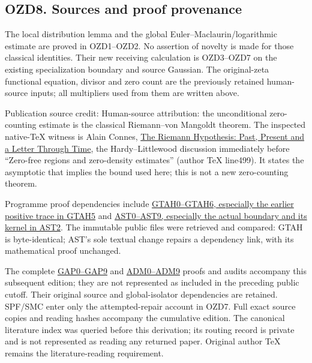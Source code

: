 \subsection{OZD8. Sources and proof
provenance}\label{ozd8.-sources-and-proof-provenance}

The local distribution lemma and the global Euler--Maclaurin/logarithmic
estimate are proved in OZD1--OZD2. No assertion of novelty is made for
those classical identities. Their new receiving calculation is
OZD3--OZD7 on the existing specialization boundary and source Gaussian.
The original-zeta functional equation, divisor and zero count are the
previously retained human-source inputs; all multipliers used from them
are written above.

Publication source credit: Human-source attribution: the unconditional
zero-counting estimate is the classical Riemann--von Mangoldt theorem.
The inspected native-TeX witness is Alain Connes,
\href{https://arxiv.org/abs/2602.04022v1}{The Riemann Hypothesis: Past,
Present and a Letter Through Time}, the Hardy--Littlewood discussion
immediately before ``Zero-free regions and zero-density estimates''
(author TeX line499). It states the asymptotic that implies the bound
used here; this is not a new zero-counting theorem.

Programme proof dependencies include
\href{https://github.com/KokunoYumeto/zeta-function-research-reader/blob/36a82ecca98addb8a98b48204e349737856c7223/workbenches/splitzero-tandem/continuations/20260924-cohomology-weight-and-character-lifts/geometric-positive-quotient/GEOMETRIC_TRANSFER_POSITIVE_ADJOINT_DEFECT.md}{GTAH0--GTAH6,
especially the earlier positive trace in GTAH5} and
\href{https://github.com/KokunoYumeto/zeta-function-research-reader/blob/36a82ecca98addb8a98b48204e349737856c7223/workbenches/splitzero-tandem/continuations/20260924-cohomology-weight-and-character-lifts/geometric-positive-quotient/ADJOINT_DEFECT_SOURCE_TOPOLOGY_COMPARISON.md}{AST0--AST9,
especially the actual boundary and its kernel in AST2}. The immutable
public files were retrieved and compared: GTAH is byte-identical; AST's
sole textual change repairs a dependency link, with its mathematical
proof unchanged.

The complete
\href{https://github.com/KokunoYumeto/zeta-function-research-reader/blob/main/workbenches/splitzero-tandem/continuations/20260925-full-source-tensor-and-original-divisor/identity/GAUSSIAN_FULL_SOURCE_APPROXIMATION.md}{GAP0--GAP9}
and
\href{https://github.com/KokunoYumeto/zeta-function-research-reader/blob/main/workbenches/splitzero-tandem/continuations/20260925-full-source-tensor-and-original-divisor/identity/ACTUAL_DEFECT_MULTIPLIER_DOMAIN.md}{ADM0--ADM9}
proofs and audits accompany this subsequent edition; they are not
represented as included in the preceding public cutoff. Their original
source and global-isolator dependencies are retained. SPF/SMC enter only
the attempted-repair account in OZD7. Full exact source copies and
reading hashes accompany the cumulative edition. The canonical
literature index was queried before this derivation; its routing record
is private and is not represented as reading any returned paper.
Original author TeX remains the literature-reading requirement.

